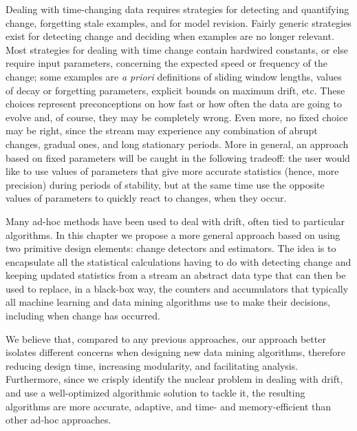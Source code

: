  Dealing with time-changing data requires %
strategies for detecting and quantifying change, forgetting stale examples, 
and for model revision. Fairly generic strategies exist for detecting
change and deciding when examples are no longer relevant. %
\BEGINOMIT
Most strategies for dealing with time change contain hardwired constants, 
or else require input parameters, concerning the expected speed or frequency 
of the change; some examples are {\em a priori} definitions of sliding window
lengths, values of decay or forgetting parameters, explicit bounds on maximum drift, etc. 
These choices represent preconceptions 
on how fast or how often the data are going to evolve and, of course, they 
may be completely wrong. Even more, no fixed 
choice may be right, since the stream may experience any combination 
of abrupt changes, gradual ones, and long stationary periods. 
More in general, an approach based on fixed parameters will be caught in the following tradeoff: 
the user would like to use values of parameters that give more accurate statistics 
(hence, more precision) during periods of stability, but at the same time use the opposite values of
 parameters to %
quickly react to changes, when they occur. 

Many ad-hoc methods have been used to deal with drift, often tied to particular algorithms. 
\ENDOMIT
\BEGINOMIT
In this chapter we propose a more general approach based on using two primitive design 
elements: change detectors and estimators. 
The idea is to 
encapsulate all the statistical calculations having to do with detecting change and keeping
updated statistics from a stream an abstract data type that can then be used to replace, 
in a black-box way, the counters and accumulators that typically all machine learning
and data mining algorithms use to make their decisions, including when change has occurred. 

We believe that, compared to any previous approaches, our approach better isolates different
concerns when designing new data mining algorithms, therefore reducing design time,
increasing modularity, and facilitating analysis. Furthermore, since we crisply identify
the nuclear problem in dealing with drift, and use a well-optimized algorithmic solution to tackle it,
the resulting algorithms are more accurate, adaptive, and time- and memory-efficient than other
ad-hoc approaches. %

